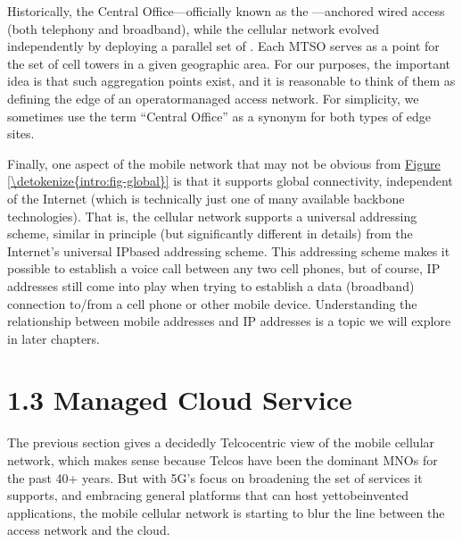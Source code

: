 \documentclass[a4paper,11pt,english]{sphinxmanual}
\begin{document}
\sphinxAtStartPar
Historically, the Central Office—officially known as the —anchored wired access
(both telephony and broadband), while the cellular network evolved
independently by deploying a parallel set of . Each MTSO serves as a 
point for the set of cell towers in a given geographic area. For our
purposes, the important idea is that such aggregation points exist,
and it is reasonable to think of them as defining the edge of an
operator\sphinxhyphen{}managed access network. For simplicity, we sometimes use the
term “Central Office” as a synonym for both types of edge sites.

\sphinxAtStartPar
Finally, one aspect of the mobile network that may not be obvious
from \hyperref[\detokenize{intro:fig-global}]{Figure \ref{\detokenize{intro:fig-global}}} is that it supports global
connectivity, independent of the Internet (which is technically just
one of many available backbone technologies). That is, the cellular
network supports a universal addressing scheme, similar in principle
(but significantly different in details) from the Internet’s universal
IP\sphinxhyphen{}based addressing scheme. This addressing scheme makes it possible
to establish a voice call between any two cell phones, but of course,
IP addresses still come into play when trying to establish a data
(broadband) connection to/from a cell phone or other mobile
device. Understanding the relationship between mobile addresses and IP
addresses is a topic we will explore in later chapters.


\section{1.3 Managed Cloud Service}
\label{\detokenize{intro:managed-cloud-service}}
\sphinxAtStartPar
The previous section gives a decidedly Telco\sphinxhyphen{}centric view of the mobile
cellular network, which makes sense because Telcos have been the
dominant MNOs for the past 40+ years. But with 5G’s focus on
broadening the set of services it supports, and embracing general
platforms that can host yet\sphinxhyphen{}to\sphinxhyphen{}be\sphinxhyphen{}invented applications, the mobile
cellular network is starting to blur the line between the access
network and the cloud.
\end{document}
